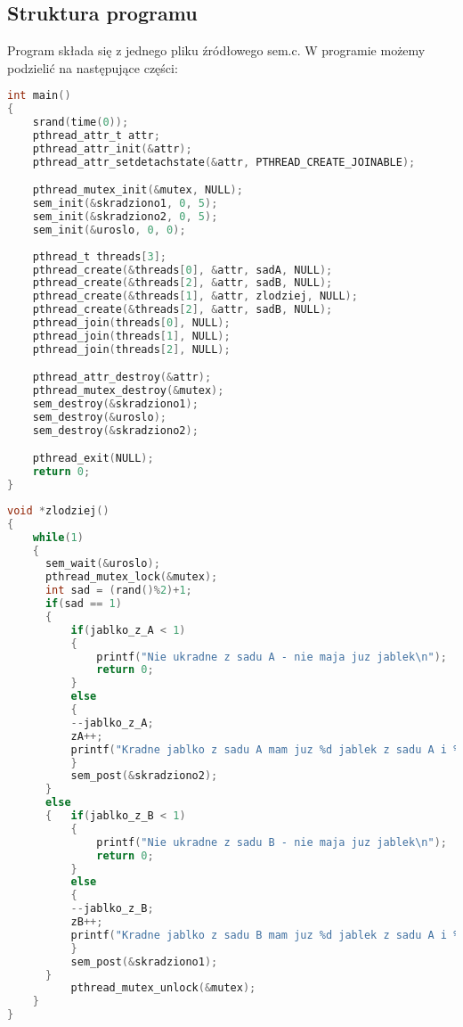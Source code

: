\documentclass[10pt,a4paper]{article}
\begin{document}
\subsection{Struktura programu}
Program składa się z jednego pliku źródłowego sem.c.
W programie możemy podzielić na następujące części:\newpage
\begin{lstlisting}[language=C,caption=Funkcja główna,basicstyle=\small]
  int main()
{
    srand(time(0));              
    pthread_attr_t attr;
    pthread_attr_init(&attr);
    pthread_attr_setdetachstate(&attr, PTHREAD_CREATE_JOINABLE);

    pthread_mutex_init(&mutex, NULL);
    sem_init(&skradziono1, 0, 5);
    sem_init(&skradziono2, 0, 5);
    sem_init(&uroslo, 0, 0);
     
    pthread_t threads[3];
    pthread_create(&threads[0], &attr, sadA, NULL);
    pthread_create(&threads[2], &attr, sadB, NULL);
    pthread_create(&threads[1], &attr, zlodziej, NULL);
    pthread_create(&threads[2], &attr, sadB, NULL);
    pthread_join(threads[0], NULL);
    pthread_join(threads[1], NULL);
    pthread_join(threads[2], NULL);

    pthread_attr_destroy(&attr);
    pthread_mutex_destroy(&mutex);
    sem_destroy(&skradziono1);
    sem_destroy(&uroslo);
    sem_destroy(&skradziono2);

    pthread_exit(NULL);
    return 0;
}
\end{lstlisting}

\begin{lstlisting}[language=C,caption=Funkcja odpowiadająca za złodzieja,basicstyle=\small]
void *zlodziej()
{   
    while(1)
    {
      sem_wait(&uroslo);
      pthread_mutex_lock(&mutex);
      int sad = (rand()%2)+1; 
      if(sad == 1)
      {
          if(jablko_z_A < 1)
          {
              printf("Nie ukradne z sadu A - nie maja juz jablek\n");
              return 0;
          } 
          else
          {
          --jablko_z_A;
          zA++;
          printf("Kradne jablko z sadu A mam juz %d jablek z sadu A i %d jablek z sadu B \n ",zA,zB);
          }
          sem_post(&skradziono2);
      }
      else
      {   if(jablko_z_B < 1)
          {
              printf("Nie ukradne z sadu B - nie maja juz jablek\n");
              return 0;
          }
          else
          {
          --jablko_z_B;
          zB++;
          printf("Kradne jablko z sadu B mam juz %d jablek z sadu A i %d jablek z sadu B \n ",zA,zB);
          }
          sem_post(&skradziono1);
      }
          pthread_mutex_unlock(&mutex);
    }
}
\end{lstlisting}
\end{document}
